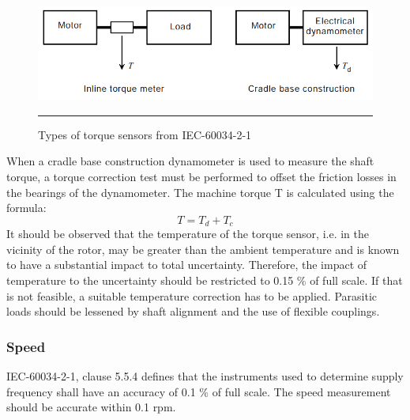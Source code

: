 \begin{figure}[htbp]
	\centering
		\includegraphics[width = 4.5in]{./Figures/MS/fig36.png}
		\rule{35em}{0.5pt}
	\caption{Types of torque sensors from IEC-60034-2-1}
	\label{fig:Types of torque sensors from IEC-60034-2-1} 
\end{figure}

When a cradle base construction dynamometer is used to measure the shaft torque, a torque correction test must be performed to offset the friction losses in the bearings of the dynamometer. The machine torque T is calculated using the formula:
\begin{equation}
T=T_{d}+T_{c}
\end{equation}
It should be observed that the temperature of the torque sensor, i.e. in the vicinity of the rotor, may be greater than the ambient temperature and is known to have a substantial impact to total uncertainty. Therefore, the impact of temperature to the uncertainty should be restricted to 0.15 \% of full scale. If that is not feasible, a suitable temperature correction has to be applied. Parasitic loads should be lessened by shaft alignment and the use of flexible couplings.

\subsubsection{Speed}
IEC-60034-2-1, clause 5.5.4 defines that the instruments used to determine supply frequency shall have an accuracy of 0.1 \% of full scale. The speed measurement should be accurate within 0.1 rpm.

